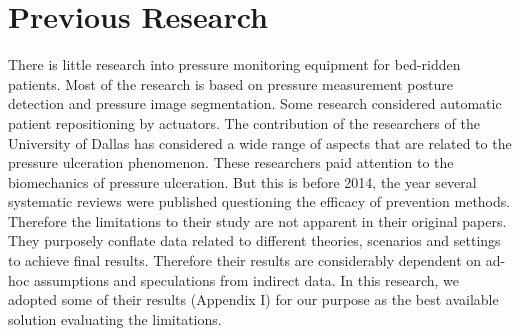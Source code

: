 \section{Previous Research}
There is little research into pressure monitoring equipment for bed-ridden patients. Most of the research is based on pressure measurement posture detection and pressure image segmentation. Some research considered automatic patient repositioning by actuators. \cite{smartmat,smartmat2}  The contribution of the researchers of the University of Dallas has considered a wide range of aspects that are related to the pressure ulceration phenomenon. \cite{schedule}  These researchers paid attention to the biomechanics of pressure ulceration. But this is before 2014, the year several systematic reviews were published questioning the efficacy of prevention methods. Therefore the limitations to their study are not apparent in their original papers. They purposely conflate data related to different theories, scenarios and settings to achieve final results. Therefore their results are considerably dependent on ad-hoc assumptions and speculations from indirect data. In this research, we adopted some of their results (Appendix I) for our purpose as the best available solution evaluating the limitations.



